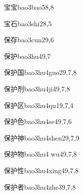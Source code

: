 \begin{verbete}{宝宝}{bao3bao5}{8,8}
\end{verbete}

\begin{verbete}{宝石}{bao3shi2}{8,5}
\end{verbete}

\begin{verbete}{保存}{bao3cun2}{9,6}
\end{verbete}

\begin{verbete}{保护}{bao3hu4}{9,7}
\end{verbete}

\begin{verbete}{保护国}{bao3hu4guo2}{9,7,8}
\end{verbete}

\begin{verbete}{保护剂}{bao3hu4ji4}{9,7,8}
\end{verbete}

\begin{verbete}{保护区}{bao3hu4qu1}{9,7,4}
\end{verbete}

\begin{verbete}{保护色}{bao3hu4se4}{9,7,6}
\end{verbete}

\begin{verbete}{保护神}{bao3hu4shen2}{9,7,9}
\end{verbete}

\begin{verbete}{保护物}{bao3hu4 wu4}{9,7,8}
\end{verbete}

\begin{verbete}{保护性}{bao3hu4xing4}{9,7,8}
\end{verbete}

\begin{verbete}{保护者}{bao3hu4zhe3}{9,7,8}
\end{verbete}

